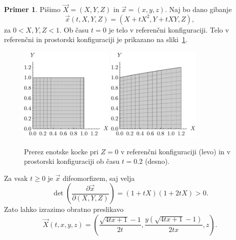 \documentclass[12pt,a4paper,twoside]{article}
\theoremstyle{definition} %
\newtheorem{primer}[definicija]{Primer}
\theoremstyle{plain} %
\numberwithin{equation}{section}
\newcommand{\dpar}[2]{\ensuremath{\frac{\partial #1}{\partial #2}}}
\newcommand{\vX}{\vec{X}}
\newcommand{\vx}{\vec{x}}
\begin{document}
\begin{primer}
  \label{prim:gib}
  Pišimo $\vX = (X, Y, Z)$ in $\vx = (x, y, z)$.  Naj bo dano gibanje
  \begin{equation}
    \vx(t, X, Y, Z) = (X + t X^2, Y + t X Y, Z),
  \end{equation}
  za $0 <
  X, Y, Z < 1$.  Ob času $t=0$ je telo v referenčni konfiguraciji. Telo v referenčni
  in prostorski konfiguraciji je prikazano na sliki~\ref{fig:gibanje}.
  \begin{figure}[h]
    \centering
    \includegraphics[width=0.4\textwidth]{images/gibanje0.pdf}
    \hspace{1em}
    \includegraphics[width=0.4\textwidth]{images/gibanje02.pdf}
    \caption[Primer gibanja enotske kocke.]{Prerez enotske kocke pri $Z = 0$ v referenčni
      konfiguraciji (levo) in v prostorski konfiguraciji ob času $t=0.2$ (desno).}
    \label{fig:gibanje}
  \end{figure}
  Za vsak $t\geq 0$ je $\vx$ difeomorfizem, saj velja
  \begin{equation}
    \det\left( \dpar{\vx}{(X, Y, Z)} \right) = (1+tX)(1+2tX) > 0.
  \end{equation}
  Zato lahko izrazimo obratno preslikavo
  \begin{equation}
    \vX(t, x, y, z) = \left(\frac{\sqrt{4 t x+1}-1}{2 t}, \frac{y
    \left(\sqrt{4 t x+1}-1\right)}{2 t x}, z\right).
    \label{eq:gibanje-inv}
  \end{equation}
\end{primer}
\end{document}
